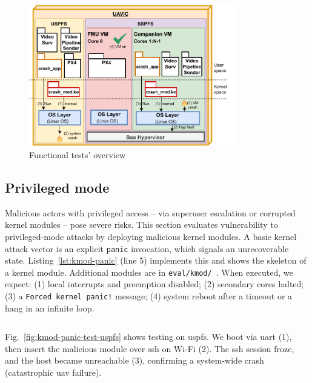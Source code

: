 \begin{figure}[!hbtp]
  \centering
  \includegraphics[width=0.8\textwidth]{./img/pdf/uav-main-eval-funcTest}
  \caption{Functional tests' overview}%
  \label{fig:uav-main-eval-kmod}
\end{figure}

\subsection{Privileged mode}
\label{sec:privileged-mode}
Malicious actors with privileged access -- via superuser escalation or corrupted
kernel modules -- pose severe risks. This section evaluates vulnerability to
privileged-mode attacks by deploying malicious kernel modules.
%
A basic kernel attack vector is an explicit \lstinline{panic} invocation, which
signals an unrecoverable state. Listing~\ref{lst:kmod-panic} (line 5) implements
this and shows the skeleton of a kernel module. Additional modules are in
\lstinline{eval/kmod/}~\cite{thesis-sw-github}. When executed, we expect: (1)
local interrupts and preemption disabled; (2) secondary cores halted; (3) a
\lstinline{Forced kernel panic!} message; (4) system reboot after a timeout or a
hang in an infinite loop.

\begin{longlisting}
\centering
\inputminted[]{c}{./listing/kmod_panic.c}
\caption[Functional tests: implementation of the panic kernel module]{Functional
  tests: implementation of the Panic kernel module (see
  \lstinline{panic_module.c}~\cite{thesis-sw-github})}
\label{lst:kmod-panic}
\end{longlisting}

Fig.~\ref{fig:kmod-panic-test-uspfs} shows testing on \gls{uspfs}. We boot via
\gls{uart} (1), then insert the malicious module over \gls{ssh} on Wi-Fi (2). The \gls{ssh}
session froze, and the host became unreachable (3), confirming a system-wide
crash (catastrophic \gls{uav} failure).

